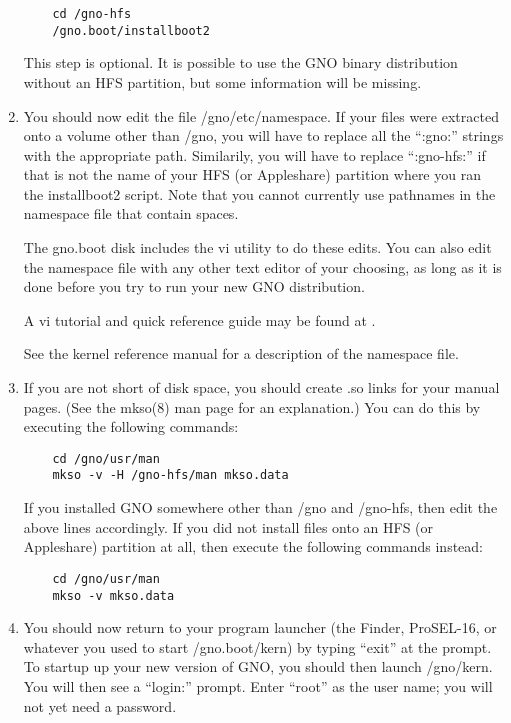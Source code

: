 \documentclass{report}
\begin{document}
\begin{enumerate}
\begin{verbatim}
	cd /gno-hfs
	/gno.boot/installboot2
\end{verbatim}

This step is optional.  It is possible to use the GNO binary
distribution without an HFS partition, but some information
will be missing.

\item
You should now edit the file /gno/etc/namespace.  If your
files were extracted onto a volume other than /gno, you will
have to replace all the ``:gno:'' strings with the appropriate
path.  Similarily, you will have to replace ``:gno-hfs:'' if
that is not the name of your HFS (or Appleshare) partition
where you ran the 
installboot2
script.  Note that you cannot currently use pathnames in the
namespace
file that contain spaces.

The 
gno.boot
disk includes the 
vi
utility to do these edits.
You can also edit the namespace file with any other text editor
of your choosing, as long as it is done before you try to run
your new GNO distribution.

A vi tutorial and quick reference guide may be found at
.

\begin{comment}
You may want to put /usr onto a different partition; it will
get fairly large over time.

If you have a RAM disk, you should consider having it renamed
to /tmp using renram5(8) or mktmp(8), in which case its entry
should be removed from the namespace file.

\end{comment}	    
See the kernel reference manual for a description of the
namespace file.

\item
If you are not short of disk space, you should create .so links
for your manual pages.  (See the mkso(8) man page for an
explanation.)  You can do this by executing the following
commands:

\begin{verbatim}
	cd /gno/usr/man
	mkso -v -H /gno-hfs/man mkso.data
\end{verbatim}

If you installed GNO somewhere other than /gno and /gno-hfs, then
edit the above lines accordingly.  If you did not install files
onto an HFS (or Appleshare) partition at all, then execute the
following commands instead:

\begin{verbatim}
	cd /gno/usr/man
	mkso -v mkso.data
\end{verbatim}

\item
You should now return to your program launcher (the Finder,
ProSEL-16, or whatever you used to start /gno.boot/kern) by
typing ``exit'' at the prompt.  To startup up your new version
of GNO, you should then launch /gno/kern.  You will then see
a ``login:'' prompt.  Enter ``root'' as the user name; you will
not yet need a password.


\end{enumerate}
\end{document}

